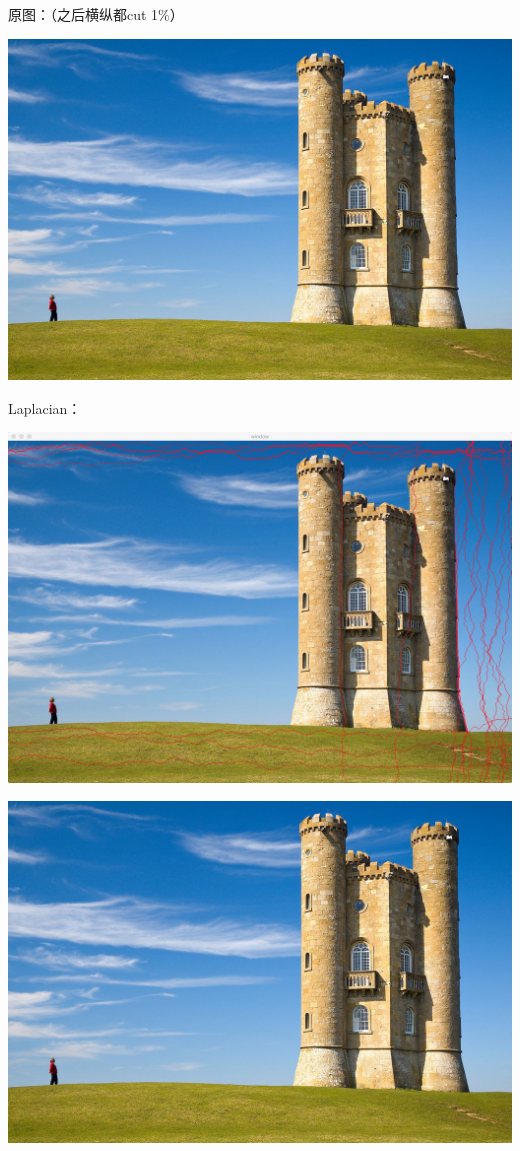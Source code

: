 \documentclass[10pt, a4paper]{article}
\begin{document}
    原图：（之后横纵都cut 1$\%$）

    \includegraphics[scale = .2]{sky.jpeg}

    Laplacian：

    \includegraphics[scale = .1]{skyLapseam.jpeg}

    \includegraphics[scale = .3]{skyLap.jpg}
\end{document}
